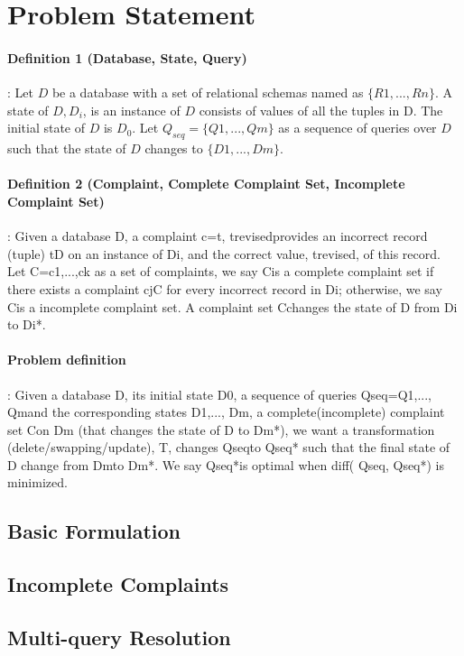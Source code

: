 \section{Problem Statement}

\paragraph{Definition 1 (Database, State, Query)}: Let $D$ be a database with a
set of relational schemas named as $\{R1, ..., Rn\}$. A state of $D, D_i$,
is an instance of $D$ consists of values of all the tuples in D. The
initial state of $D$ is $D_0$. Let $Q_{seq}=\{Q1,..., Qm\}$ as a sequence of
queries over $D$ such that the state of $D$ changes to $\{D1,..., Dm\}$.


\paragraph{Definition 2 (Complaint, Complete Complaint Set, Incomplete
Complaint Set)}:
Given a database D, a complaint c={t, trevised}provides an incorrect
record (tuple) tD on an instance of Di, and the correct value,
trevised, of this record. Let C={c1,...,ck} as a set of complaints,
we say Cis a complete complaint set if there exists a complaint
cjC for every incorrect record in Di; otherwise, we say Cis a
incomplete complaint set. A complaint set Cchanges the state of D
from Di to Di*.

\paragraph{Problem definition}: Given a database D, its initial
state D0, a sequence of queries Qseq={Q1,..., Qm}and the corresponding
states {D1,..., Dm}, a complete(incomplete) complaint set  Con Dm
(that changes the state of D to Dm*), we want a transformation
(delete/swapping/update), T, changes Qseqto Qseq* such that the
final state of D change from Dmto Dm*. We say  Qseq*is optimal when
diff( Qseq, Qseq*) is minimized.


\subsection{Basic Formulation}

\subsection{Incomplete Complaints}

\subsection{Multi-query Resolution}


